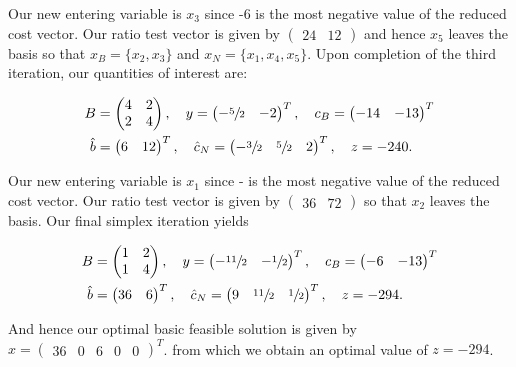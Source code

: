 \begin{solution}
  Our new entering variable is $x_3$ since -6 is the most negative value of the reduced cost vector. Our ratio test 
  vector is given by $\begin{pmatrix} 24 & 12 \end{pmatrix}$ and hence $x_5$ leaves the basis so that 
  $x_B = \{ x_2, x_3 \}$ and $x_N = \{ x_1, x_4, x_5 \}$. Upon completion of the third iteration, our quantities of 
  interest are:

  \begin{align*}
    B &= \begin{pmatrix}
      4 & 2 \\
      2 & 4
    \end{pmatrix}, \quad y = \begin{pmatrix}
      -\sfrac{5}{2} & -2
    \end{pmatrix}^T, \quad c_B = \begin{pmatrix}
      -14 & -13
    \end{pmatrix}^T \\
    \hat{b} &= \begin{pmatrix}
      6 & 12
    \end{pmatrix}^T, \quad \hat{c}_N = \begin{pmatrix}
      -\sfrac{3}{2} & \sfrac{5}{2} & 2
    \end{pmatrix}^T, \quad z = -240.
  \end{align*}

  Our new entering variable is $x_1$ since - is the most negative value of the reduced cost vector. Our
  ratio test vector is given by $\begin{pmatrix} 36 & 72 \end{pmatrix}$ so that $x_2$ leaves the basis. Our final
  simplex iteration yields


  \begin{align*}
    B &= \begin{pmatrix}
      1 & 2 \\
      1 & 4
    \end{pmatrix}, \quad y = \begin{pmatrix}
      -\sfrac{11}{2} & -\sfrac{1}{2}
    \end{pmatrix}^T, \quad c_B = \begin{pmatrix}
      -6 & -13
    \end{pmatrix}^T \\
    \hat{b} &= \begin{pmatrix}
      36 & 6
    \end{pmatrix}^T, \quad \hat{c}_N = \begin{pmatrix}
      9 & \sfrac{11}{2} & \sfrac{1}{2}
    \end{pmatrix}^T, \quad z = -294.
  \end{align*}

  And hence our optimal basic feasible solution is given by $x = \begin{pmatrix} 36 & 0 & 6 & 0 & 0 \end{pmatrix}^T$.
  from which we obtain an optimal value of $z = -294$.
\end{solution}